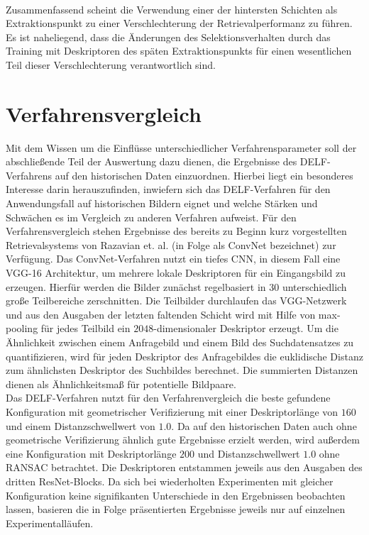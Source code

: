 \\
Zusammenfassend scheint die Verwendung einer der hintersten Schichten als Extraktionspunkt zu einer Verschlechterung der Retrievalperformanz zu führen. Es ist naheliegend, dass die Änderungen des Selektionsverhalten durch das Training mit Deskriptoren des späten Extraktionspunkts für einen wesentlichen Teil dieser Verschlechterung verantwortlich sind.

\section{Verfahrensvergleich}

Mit dem Wissen um die Einflüsse unterschiedlicher Verfahrensparameter soll der abschließende Teil der Auswertung dazu dienen, die Ergebnisse des DELF-Verfahrens auf den historischen Daten einzuordnen. Hierbei liegt ein besonderes Interesse darin herauszufinden, inwiefern sich das DELF-Verfahren für den Anwendungsfall auf historischen Bildern eignet und welche Stärken und Schwächen es im Vergleich zu anderen Verfahren aufweist. Für den Verfahrensvergleich stehen Ergebnisse des bereits zu Beginn kurz vorgestellten Retrievalsystems von Razavian et. al. \cite{convnet} (in Folge als ConvNet bezeichnet) zur Verfügung. Das ConvNet-Verfahren nutzt ein tiefes CNN, in diesem Fall eine VGG-16 Architektur, um mehrere lokale Deskriptoren für ein Eingangsbild zu erzeugen. Hierfür werden die Bilder zunächst regelbasiert in $30$ unterschiedlich große Teilbereiche zerschnitten. Die Teilbilder durchlaufen das VGG-Netzwerk und aus den Ausgaben der letzten faltenden Schicht wird mit Hilfe von max-pooling für jedes Teilbild ein $2048$-dimensionaler Deskriptor erzeugt. Um die Ähnlichkeit zwischen einem Anfragebild und einem Bild des Suchdatensatzes zu quantifizieren, wird für jeden Deskriptor des Anfragebildes die euklidische Distanz zum ähnlichsten Deskriptor des Suchbildes berechnet. Die summierten Distanzen dienen als Ähnlichkeitsmaß für potentielle Bildpaare.
\\
Das DELF-Verfahren nutzt für den Verfahrenvergleich die beste gefundene Konfiguration mit geometrischer Verifizierung mit einer Deskriptorlänge von $160$ und einem Distanzschwellwert von $1.0$. Da auf den historischen Daten auch ohne geometrische Verifizierung ähnlich gute Ergebnisse erzielt werden, wird außerdem eine Konfiguration mit Deskriptorlänge $200$ und Distanzschwellwert $1.0$ ohne RANSAC betrachtet. Die Deskriptoren entstammen jeweils aus den Ausgaben des dritten ResNet-Blocks. Da sich bei wiederholten Experimenten mit gleicher Konfiguration keine signifikanten Unterschiede in den Ergebnissen beobachten lassen, basieren die in Folge präsentierten Ergebnisse jeweils nur auf einzelnen Experimentalläufen.
